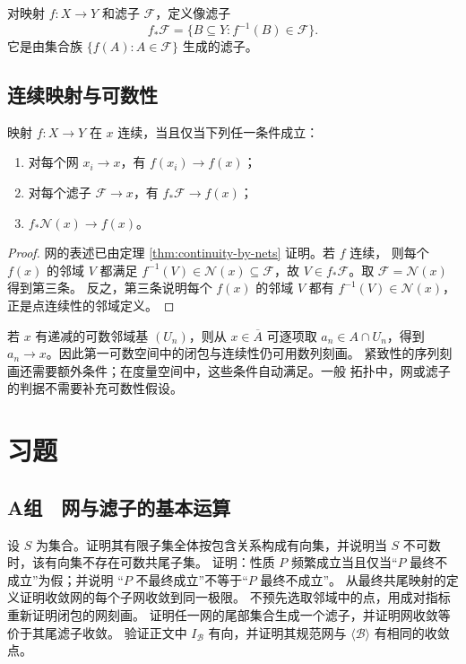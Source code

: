 对映射 \(f:X\to Y\) 和滤子 \(\mathcal F\)，定义像滤子
\[
 f_*\mathcal F
 =\{B\subseteq Y:f^{-1}(B)\in\mathcal F\}.
\]
它是由集合族 \(\{f(A):A\in\mathcal F\}\) 生成的滤子。

\subsection{连续映射与可数性}

\begin{corollary}[连续性的三种表述]
映射 \(f:X\to Y\) 在 \(x\) 连续，当且仅当下列任一条件成立：
\begin{enumerate}[label=\textup{(\roman*)}]
 \item 对每个网 \(x_i\to x\)，有 \(f(x_i)\to f(x)\)；
 \item 对每个滤子 \(\mathcal F\to x\)，有
 \(f_*\mathcal F\to f(x)\)；
 \item \(f_*\mathcal N(x)\to f(x)\)。
\end{enumerate}
\end{corollary}

\begin{proof}
网的表述已由定理 \ref{thm:continuity-by-nets} 证明。若 \(f\) 连续，
则每个 \(f(x)\) 的邻域 \(V\) 都满足
\(f^{-1}(V)\in\mathcal N(x)\subseteq\mathcal F\)，故
\(V\in f_*\mathcal F\)。取 \(\mathcal F=\mathcal N(x)\) 得到第三条。
反之，第三条说明每个 \(f(x)\) 的邻域 \(V\) 都有
\(f^{-1}(V)\in\mathcal N(x)\)，正是点连续性的邻域定义。
\end{proof}

若 \(x\) 有递减的可数邻域基 \((U_n)\)，则从
\(x\in\overline A\) 可逐项取 \(a_n\in A\cap U_n\)，得到
\(a_n\to x\)。因此第一可数空间中的闭包与连续性仍可用数列刻画。
紧致性的序列刻画还需要额外条件；在度量空间中，这些条件自动满足。一般
拓扑中，网或滤子的判据不需要补充可数性假设。

\section*{习题}

\subsection*{A组　网与滤子的基本运算}
\begin{enumerate}[label=\textbf{\thechapter.\arabic*.}]
 设 \(S\) 为集合。证明其有限子集全体按包含关系构成有向集，并说明当
 \(S\) 不可数时，该有向集不存在可数共尾子集。
 证明：性质 \(P\) 频繁成立当且仅当“\(P\) 最终不成立”为假；并说明
 “\(P\) 不最终成立”不等于“\(P\) 最终不成立”。
 从最终共尾映射的定义证明收敛网的每个子网收敛到同一极限。
 不预先选取邻域中的点，用成对指标重新证明闭包的网刻画。
 证明任一网的尾部集合生成一个滤子，并证明网收敛等价于其尾滤子收敛。
 验证正文中 \(I_{\mathcal B}\) 有向，并证明其规范网与
 \(\langle\mathcal B\rangle\) 有相同的收敛点。
\end{enumerate}

